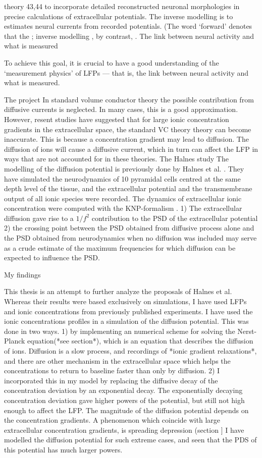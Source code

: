 \documentclass{article}
\begin{document}
theory 43,44 to incorporate detailed reconstructed neuronal morphologies in precise
calculations of extracellular potentials. The inverse modelling is to estimates neural currents from recorded potentials. (The word ‘forward’ denotes that
the ; inverse modelling , by contrast,
.
 The link between neural activity and what is measured

To achieve this goal, it is crucial to have a good
understanding of the ‘measurement physics’ of LFPs
— that is, the link between neural activity and what is
measured.

{The project}
In standard volume conductor theory the possible contribution from diffusive currents is neglected. In many cases, this is a good approximation. However, resent studies have suggested that for large ionic concentration gradients in the extracellular space, the standard VC theory theory can become inaccurate. This is because a concentration gradient may lead to diffusion. The diffusion of ions will cause a diffusive current, which in turn can affect the LFP in ways that are not accounted for in these theories.  
{The Halnes study}
The modelling of the diffusion potential is previously done by Halnes et al. \cite{Halnes2016}. They have simulated the neurodynamics of 10 pyramidal cells centred at the same depth level of the tissue, and the extracellular potential and the transmembrane output of all ionic species were recorded. The dynamics of extracellular ionic concentration were computed with the KNP-formalism \cite{Halnes}.   1) The extracellular diffusion gave rise to a $1/f^2$ contribution to the PSD of the extracellular potential 2) the crossing point between the PSD obtained from diffusive process alone and the PSD obtained from neurodynamics when no diffusion was included may serve as a crude estimate of the maximum frequencies for which diffusion can be expected to influence the PSD. 

{My findings}

This thesis is an attempt to further analyze the proposals of Halnes et al. Whereas their results were based exclusively on simulations, I have used LFPs and ionic concentrations from previously published experiments. I have used the ionic concentrations profiles in a simulation of the diffusion potential. This was done in two ways. 1) by implementing an numerical scheme for solving the Nerst-Planck equation(*see section*), which is an equation that describes the diffusion of ions. Diffusion is a slow process, and recordings of *ionic gradient relaxations*, and there are other mechanism in the extracellular space which helps the concentrations to return to baseline faster than only by diffusion. 2)  I incorporated this in my model by replacing the diffusive decay of the concentration deviation by an exponential decay. The exponentially decaying concentration deviation gave higher powers of the potential, but still not high enough to affect the LFP. The magnitude of the diffusion potential depends on the concentration gradients. A phenomenon which coincide with large extracellular concentration gradients, is spreading depression (section ] I have modelled the diffusion potential for such extreme cases, and seen that the PDS of this potential has much larger powers. 
 
\end{document}
